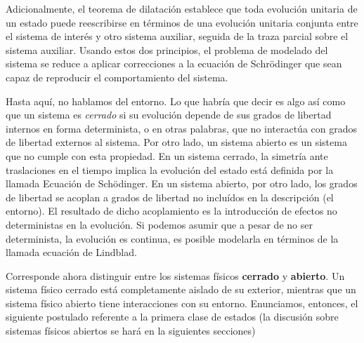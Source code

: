 \begin{Omitir}
Adicionalmente, el teorema de dilatación \cite{Stinespring,KasparovabtSt.} establece que toda evolución unitaria de un estado puede reescribirse en términos de una evolución unitaria conjunta entre el sistema de interés y otro sistema auxiliar, seguida de la traza parcial sobre el sistema auxiliar. Usando estos dos principios, el problema de modelado del sistema se reduce a aplicar correcciones a la ecuación de Schrödinger que sean capaz de reproducir el comportamiento del sistema.
\end{Omitir}
\begin{Omitir}
{\color{blue} Hasta aquí, no hablamos del entorno. Lo que habría que decir es algo así como que un sistema es \emph{cerrado} si su evolución depende de sus grados de libertad internos en forma determinista, o en otras palabras, que no interactúa con grados de libertad externos al sistema. 
Por otro lado, un sistema abierto es un sistema que no cumple con esta propiedad.  
En un sistema cerrado, la simetría ante traslaciones en el tiempo implica la evolución del estado está definida por la llamada Ecuación de Sch\"odinger\cite{HeinzPetruccione,Sch35}. En un sistema abierto, por otro lado, los grados de libertad se acoplan a grados de libertad no incluídos en la descripción (el entorno). El resultado de dicho acoplamiento es la introducción de efectos no deterministas en la evolución. Si podemos asumir que a pesar de no ser determinista, la evolución es continua, es posible modelarla en términos de la llamada ecuación de Lindblad\cite{HeinzPetruccione}\cite{Lindblad1976}.  }
\end{Omitir}



 

\begin{Omitir}
Corresponde ahora distinguir entre los sistemas físicos \textbf{cerrado} y \textbf{abierto}. Un sistema físico cerrado está completamente aislado de su exterior, mientras que un sistema físico abierto tiene interacciones con su entorno. Enunciamos, entonces, el siguiente postulado referente a la primera clase de estados (la discusión sobre sistemas físicos abiertos se hará en la siguientes secciones) 
\end{Omitir}




